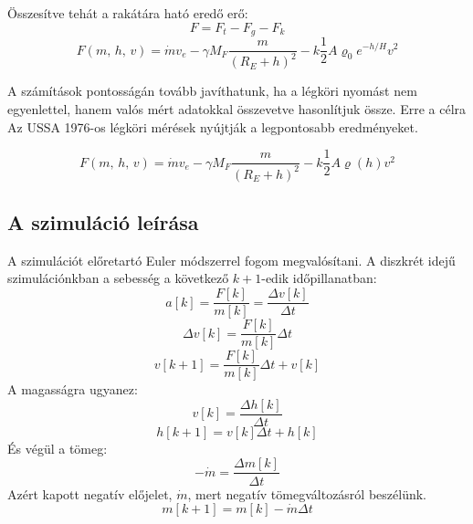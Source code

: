 \documentclass[12pt]{article}
\begin{document}
Összesítve tehát a rakátára ható eredő erő:
\begin{equation*}
    F = F_t - F_g - F_k
\end{equation*}
\begin{equation}
    F(m,\,h,\,v) = \dot{m}v_e - \gamma M_F\dfrac{m}{(R_E + h)^2} - k\frac{1}{2}A\varrho_0 e^{-h/H}v^2
\end{equation}

A számítások pontosságán tovább javíthatunk, ha a légköri nyomást nem egyenlettel, hanem valós mért adatokkal összevetve hasonlítjuk össze.
Erre a célra Az USSA 1976-os légköri mérések \cite{NNU76} nyújtják a legpontosabb eredményeket. 

\begin{equation}
    F(m,\,h,\,v) = \dot{m}v_e - \gamma M_F\dfrac{m}{(R_E + h)^2} - k\frac{1}{2}A\varrho(h)v^2
\end{equation}

\subsection{A szimuláció leírása}
A szimulációt előretartó Euler módszerrel fogom megvalósítani. A diszkrét idejű szimulációnkban a sebesség a következő $k+1$-edik időpillanatban:
\[a[k] = \frac{F[k]}{m[k]} = \frac{\Delta v [k]}{\Delta t}\]
\[\Delta v[k] = \frac{F[k]}{m[k]}\Delta t\]
\begin{equation}
    v[k+1] = \frac{F[k]}{m[k]}\Delta t + v[k]
\end{equation}
A magasságra ugyanez:
\[v[k] = \frac{\Delta h[k]}{\Delta t}\]
\begin{equation}
    h[k+1] = v[k]\Delta t + h[k]
\end{equation}
És végül a tömeg:
\[-\dot{m} = \frac{\Delta m [k]}{\Delta t}\]
Azért kapott negatív előjelet, $\dot{m}$, mert negatív tömegváltozásról beszélünk.
\begin{equation}
    m[k+1] = m[k] - \dot{m}\Delta t
\end{equation}


\clearpage
\printbibliography


\end{document}
